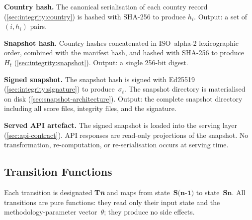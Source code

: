 \begin{description}[style=nextline, leftmargin=4em, labelwidth=3.5em]
  \item[\textbf{S6}] \textbf{Country hash.}\enspace
    The canonical serialisation of each country record
    (\cref{sec:integrity:country}) is hashed with SHA-256 to produce
    \(h_i\).  Output: a set of \((i, h_i)\) pairs.

  \item[\textbf{S7}] \textbf{Snapshot hash.}\enspace
    Country hashes concatenated in ISO~alpha-2 lexicographic order,
    combined with the manifest hash, and hashed with SHA-256 to
    produce~\(H_t\) (\cref{sec:integrity:snapshot}).  Output: a single
    256-bit digest.

  \item[\textbf{S8}] \textbf{Signed snapshot.}\enspace
    The snapshot hash is signed with Ed25519 (\cref{sec:integrity:signature})
    to produce~\(\sigma_t\).  The snapshot directory is materialised on disk
    (\cref{sec:snapshot-architecture}).  Output: the complete snapshot
    directory including all score files, integrity files, and the signature.

  \item[\textbf{S9}] \textbf{Served API artefact.}\enspace
    The signed snapshot is loaded into the serving layer
    (\cref{sec:api-contract}).  API responses are read-only projections of
    the snapshot.  No transformation, re-computation, or re-serialisation
    occurs at serving time.

\end{description}

\subsection{Transition Functions}\label{sec:state:transitions}

Each transition is designated \textbf{T\textit{n}} and maps from
state~\(\textbf{S(n{-}1)}\) to state~\(\textbf{Sn}\).  All transitions
are pure functions: they read only their input state and the
methodology-parameter vector~\(\theta\); they produce no side effects.

